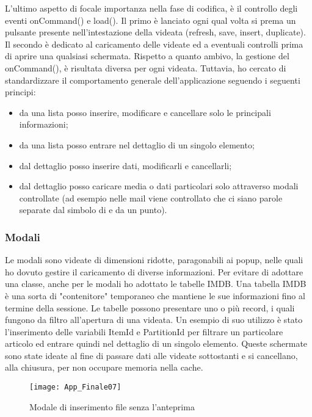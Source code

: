 L'ultimo aspetto di focale importanza nella fase di codifica, è il controllo degli eventi onCommand() e load(). Il primo è lanciato ogni qual volta si prema un pulsante presente nell'intestazione della videata (refresh, save, insert, duplicate).  Il secondo è dedicato al caricamento delle videate ed a eventuali controlli prima di aprire una qualsiasi schermata.
Rispetto a quanto ambivo, la gestione del onCommand(), è risultata diversa per ogni videata.  Tuttavia, ho cercato di standardizzare il comportamento generale dell'applicazione seguendo i seguenti principi:
\begin{itemize}
	\item da una lista posso inserire, modificare e cancellare solo le principali informazioni;
	\item da una lista posso entrare nel dettaglio di un singolo elemento;
	\item dal dettaglio posso inserire dati, modificarli e cancellarli;
	\item dal dettaglio posso caricare media o dati particolari solo attraverso modali controllate (ad esempio nelle mail viene controllato che ci siano parole separate dal simbolo di \@ e da un punto).
\end{itemize}


\subsubsection{Modali}
Le modali sono videate di dimensioni ridotte, paragonabili ai popup, nelle quali ho dovuto gestire il caricamento di diverse informazioni. Per evitare di adottare una classe, anche per le modali ho adottato le tabelle IMDB. 
Una tabella IMDB è una sorta di "contenitore" temporaneo che mantiene le sue informazioni fino al termine della sessione. Le tabelle possono presentare uno o più record, i quali fungono da filtro all'apertura di una videata. Un esempio di suo utilizzo è stato l'inserimento delle variabili ItemId e PartitionId per filtrare un particolare articolo ed entrare quindi nel dettaglio di un singolo elemento.
Queste schermate sono state ideate al fine di passare dati alle videate sottostanti e si cancellano, alla chiusura, per non occupare memoria nella cache.

\begin{figure}[!h] 
	\centering 
	\texttt{[image: App\_Finale07]}
	\caption{Modale di inserimento file senza l'anteprima}
	\label{Modale}
\end{figure}


